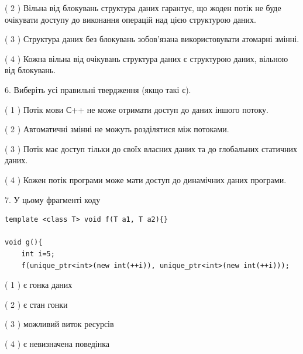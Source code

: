 \documentclass[12pt, ukrainian]{article}
\begin{document}
\begin {large}
{( 2 ) Вільна від блокувань структура даних гарантує, що жоден потік не буде очікувати доступу до виконання операцій над цією структурою даних.%

( 3 ) Структура даних без блокувань зобов’язана використовувати атомарні змінні.%

( 4 ) Кожна вільна від очікувань структура даних є структурою даних, вільною від блокувань.%
\newpage



\vspace{5mm}
6. Виберіть усі правильні твердження (якщо такі є).\par
\vspace{2mm}

( 1 ) Потік мови С++ не може отримати доступ до даних іншого потоку.%

( 2 ) Автоматичні змінні не можуть розділятися між потоками.%

( 3 ) Потік має доступ тільки до своїх власних даних та до глобальних статичних даних.%

( 4 ) Кожен потік програми може мати доступ до динамічних даних програми.%


\vspace{5mm}
7. У цьому фрагменті коду
\begin{verbatim}
template <class T> void f(T a1, T a2){}

void g(){
    int i=5;
    f(unique_ptr<int>(new int(++i)), unique_ptr<int>(new int(++i)));
\end{verbatim}

( 1 ) є гонка даних%

( 2 ) є стан гонки%

( 3 ) можливий виток ресурсів%

( 4 ) є невизначена поведінка%
}
\end {large}
\end{document}
